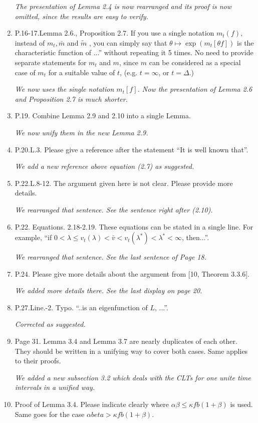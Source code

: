 \documentclass[12pt,a4paper]{amsart}
\numberwithin{equation}{section}
\theoremstyle{plain}
\theoremstyle{definition}
\begin{document}
\begin{enumerate}
  \emph{The presentation of Lemma 2.4 is now rearranged and its proof is now omitted, since the results are easy to verify.}
\item
  P.16-17.Lemma 2.6., Proposition 2.7. 
  If you use a single notation $m_t(f)$, instead of $m_t, \bar m$ and $\tilde m$ , you can simply say that $\theta \mapsto \exp(m_t[\theta f])$ is the characteristic function of ...” without repeating it 5 times. 
  No need to provide separate statements for $m_t$ and $m$, since $m$ can be considered as a special case of $m_t$ for a suitable value of $t$, (e.g. $t = \infty$, or $t = \Delta$.)
  
  \emph{We now uses the single notation $m_t[f]$. Now the presentation of Lemma 2.6 and Proposition 2.7 is much shorter.}
\item
  P.19.
  Combine Lemma 2.9 and 2.10 into a single Lemma.
  
  \emph{We now unify them in the new Lemma 2.9.}
\item
  P.20.L.3. 
  Please give a reference after the statement “It is well known that”.
  
  \emph{We add a new reference above equation (2.7) as suggested.}
\item
  P.22.L.8-12. 
  The argument given here is not clear. 
  Please provide more details.
  
  \emph{We rearranged that sentence. See the sentence right after (2.10).}
\item
  P.22. Equations. 2.18-2.19. 
  These equations can be stated in a single line. 
  For example, “if $0< \lambda \leq v_t(\lambda) < \bar v < v_t(\lambda^*)<\lambda^* < \infty$, then...”.
  
  \emph{We rearranged that sentence. See the last sentence of Page 18.}
  
\item
  P.24. 
  Please give more details about the argument from [10, Theorem 3.3.6].

  \emph{We added more details there. See the last display on page 20.}
  
\item
  P.27.Line.-2. 
  Typo. ``..is an eigenfunction of $L$, ...''.
  
  \emph{Corrected as suggested.}
\item
  Page 31. Lemma 3.4 and Lemma 3.7 are nearly duplicates of each other. 
  They should be written in a unifying way to cover both cases. Same applies to their proofs.
  
  \emph{We added a new subsection 3.2 which deals with the CLTs for one unite time intervals in a unified way.}
\item
  Proof of Lemma 3.4. Please indicate clearly where $\alpha \beta \leq \kappa f b(1 + \beta)$ is used. 
  Same goes for the case $\alpha beta > \kappa f b(1 + \beta)$.
  

\end{enumerate}
\end{document}
